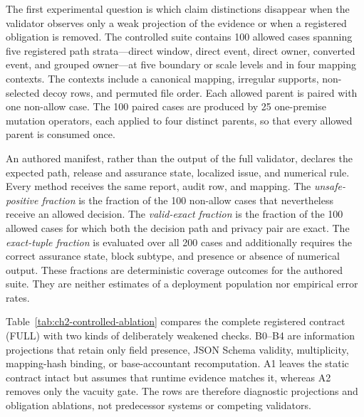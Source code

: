 The first experimental question is which claim distinctions disappear when the
validator observes only a weak projection of the evidence or when a registered
obligation is removed.  The controlled suite contains 100 allowed cases spanning
five registered path strata---direct window, direct event, direct owner,
converted event, and grouped owner---at five boundary or scale levels and in four
mapping contexts.  The contexts include a canonical mapping, irregular supports,
non-selected decoy rows, and permuted file order.  Each allowed parent is paired
with one non-allow case.  The 100 paired cases are produced by 25 one-premise
mutation operators, each applied to four distinct parents, so that every allowed
parent is consumed once.

An authored manifest, rather than the output of the full validator, declares the
expected path, release and assurance state, localized issue, and numerical rule.
Every method receives the same report, audit row, and mapping.  The
\emph{unsafe-positive fraction} is the fraction of the 100 non-allow cases that
nevertheless receive an allowed decision.  The \emph{valid-exact fraction} is the
fraction of the 100 allowed cases for which both the decision path and privacy
pair are exact.  The \emph{exact-tuple fraction} is evaluated over all 200 cases
and additionally requires the correct assurance state, block subtype, and
presence or absence of numerical output.  These fractions are deterministic
coverage outcomes for the authored suite.  They are neither estimates of a
deployment population nor empirical error rates.

Table~\ref{tab:ch2-controlled-ablation} compares the complete registered contract
(\textsf{FULL}) with two kinds of deliberately weakened checks.  B0--B4 are
information projections that retain only field presence, JSON Schema validity,
multiplicity, mapping-hash binding, or base-accountant recomputation.  A1 leaves
the static contract intact but assumes that runtime evidence matches it, whereas
A2 removes only the vacuity gate.  The rows are therefore diagnostic projections
and obligation ablations, not predecessor systems or competing validators.

